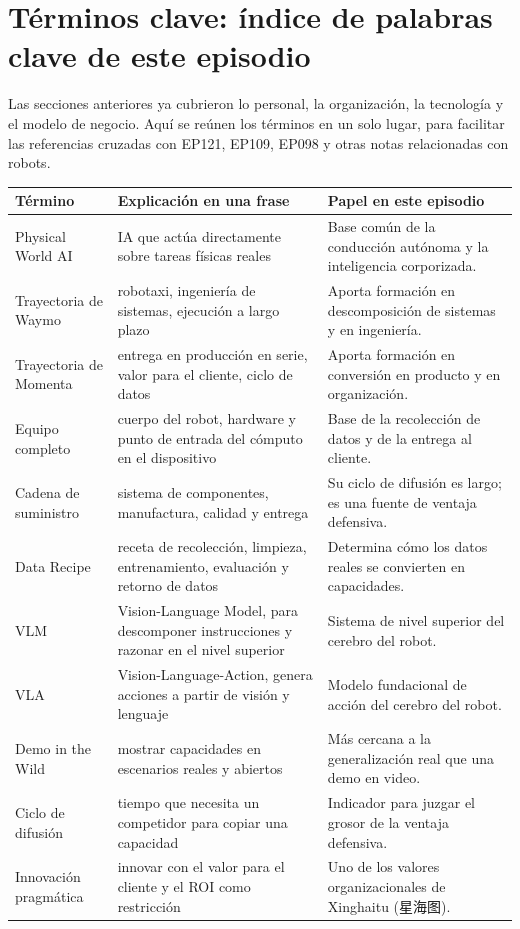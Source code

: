 \section{Términos clave: índice de palabras clave de este episodio}

Las secciones anteriores ya cubrieron lo personal, la organización, la tecnología y el modelo de negocio. Aquí se reúnen los términos en un solo lugar, para facilitar las referencias cruzadas con EP121, EP109, EP098 y otras notas relacionadas con robots.

\begin{longtable}{p{}p{}p{}}
\toprule
Término & Explicación en una frase & Papel en este episodio \\
\midrule
Physical World AI & IA que actúa directamente sobre tareas físicas reales & Base común de la conducción autónoma y la inteligencia corporizada. \\
Trayectoria de Waymo & robotaxi, ingeniería de sistemas, ejecución a largo plazo & Aporta formación en descomposición de sistemas y en ingeniería. \\
Trayectoria de Momenta & entrega en producción en serie, valor para el cliente, ciclo de datos & Aporta formación en conversión en producto y en organización. \\
Equipo completo & cuerpo del robot, hardware y punto de entrada del cómputo en el dispositivo & Base de la recolección de datos y de la entrega al cliente. \\
Cadena de suministro & sistema de componentes, manufactura, calidad y entrega & Su ciclo de difusión es largo; es una fuente de ventaja defensiva. \\
Data Recipe & receta de recolección, limpieza, entrenamiento, evaluación y retorno de datos & Determina cómo los datos reales se convierten en capacidades. \\
VLM & Vision-Language Model, para descomponer instrucciones y razonar en el nivel superior & Sistema de nivel superior del cerebro del robot. \\
VLA & Vision-Language-Action, genera acciones a partir de visión y lenguaje & Modelo fundacional de acción del cerebro del robot. \\
Demo in the Wild & mostrar capacidades en escenarios reales y abiertos & Más cercana a la generalización real que una demo en video. \\
Ciclo de difusión & tiempo que necesita un competidor para copiar una capacidad & Indicador para juzgar el grosor de la ventaja defensiva. \\
Innovación pragmática & innovar con el valor para el cliente y el ROI como restricción & Uno de los valores organizacionales de Xinghaitu (星海图). \\
\bottomrule
\end{longtable}

